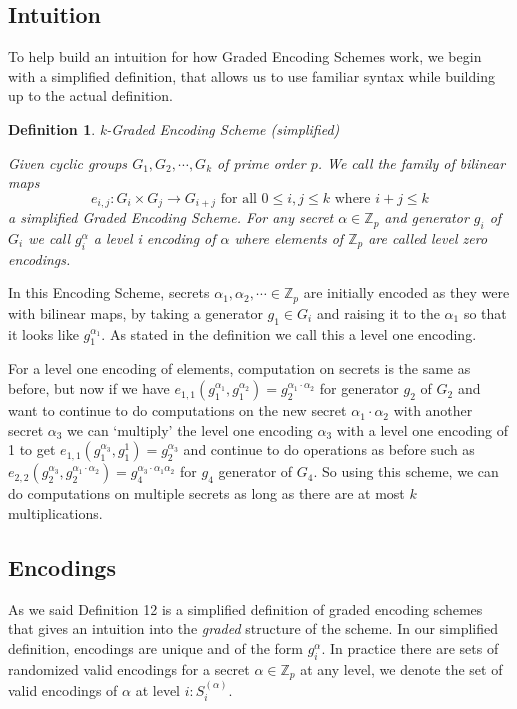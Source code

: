 \documentclass[12pt,twoside]{reedthesis}
\newtheorem{definition}{Definition}
\newcommand{\Z}[0]{\mathbb{Z}}
\begin{document}
    \subsection{Intuition}
    To help build an intuition for how Graded Encoding Schemes work, we begin with a simplified definition, that allows us to use familiar syntax while building up to the actual definition.    
    \begin{definition}{k-Graded Encoding Scheme (simplified)} 
    \par Given cyclic groups $G_1,G_2, \cdots , G_k$ of prime order $p$. We call the family of bilinear maps $$e_{i,j}:G_i \times G_j \rightarrow G_{i+j} \text{ for all } 0 \leq i,j \leq k \text{ where } i+j \leq k$$
    a simplified Graded Encoding Scheme. For any secret $\alpha \in \Z_p$ and generator $g_i$ of $G_i$ we call $g_i^\alpha$ a level i encoding of $\alpha$ where elements of $\Z_p$ are called level zero encodings. 
    \end{definition}
    
    In this Encoding Scheme, secrets $\alpha_1,\alpha_2, \cdots \in \Z_p$ are initially encoded as they were with bilinear maps, by taking a generator $g_1\in G_i$ and raising it to the $\alpha_1$ so that it looks like $g_1^{\alpha_1}$. As stated in the definition we call this a level one encoding.
    \par For a level one encoding of elements, computation on secrets is the same as before, but now if we have $e_{1,1}(g_1^{\alpha_1},g_1^{\alpha_2})=g_2^{\alpha_1\cdot \alpha_2}$ for generator $g_2$ of $G_2$ and want to continue to do computations on the new secret $\alpha_1 \cdot \alpha_2$ with another secret $\alpha_3$ we can `multiply' the level one encoding $\alpha_3$ with a level one encoding of 1 to get $e_{1,1}(g_1^{\alpha_3},g_1^1) = g_2^{\alpha_3}$ and continue to do operations as before such as $e_{2,2}(g_2^{\alpha_3},g_2^{\alpha_1\cdot \alpha_2 }) = g_4^{\alpha_3\cdot \alpha_1 \alpha_2}$ for $g_4$ generator of $G_4$. So using this scheme, we can do computations on multiple secrets as long as there are at most $k$ multiplications.
    
    
    \subsection{Encodings}
    As we said Definition 12 is a simplified definition of graded encoding schemes that gives an intuition into the \textit{graded} structure of the scheme. In our simplified definition, encodings are unique and of the form $g_i^\alpha$. In practice there are sets of randomized valid encodings for a secret $\alpha \in \Z_p$ at any level, we denote the set of valid encodings of $\alpha$ at level $i: S_i^{(\alpha)}$.
    
\end{document}
